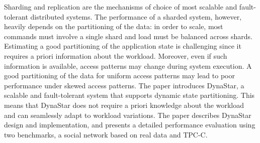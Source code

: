 
Sharding and replication are the mechanisms of choice of most scalable and fault-tolerant distributed systems.
The performance of a sharded system, however, heavily depends on the partitioning of the data: in order to scale, most commands must involve a single shard and load must be balanced across shards.
Estimating a good partitioning of the application state is challenging since it requires a priori information about the workload.
Moreover, even if such information is available, access patterns may change during system execution.
A good partitioning of the data for uniform access patterns may lead to poor performance under skewed access patterns.
The paper introduces DynaStar, a scalable and fault-tolerant system that supports dynamic state partitioning.
This means that DynaStar does not require a priori knowledge about the workload and can seamlessly adapt to workload variations.
The paper describes DynaStar design and implementation, and presents a detailed performance evaluation using two benchmarks, a social network based on real data and TPC-C.


